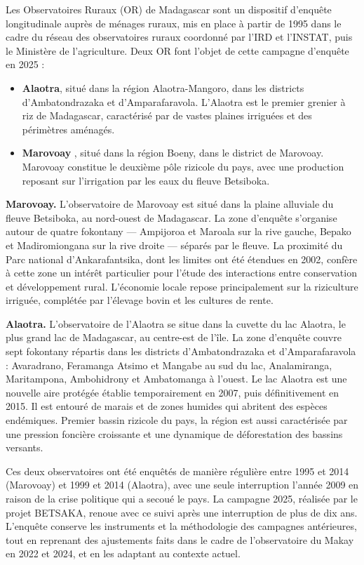 \documentclass[
  french,
  letterpaper,
]{report}
\providecommand{\tightlist}{%
  \setlength{\itemsep}{0pt}\setlength{\parskip}{0pt}}
\begin{document}
Les Observatoires Ruraux (OR) de Madagascar sont un dispositif d'enquête
longitudinale auprès de ménages ruraux, mis en place à partir de 1995
dans le cadre du réseau des observatoires ruraux coordonné par l'IRD et
l'INSTAT, puis le Ministère de l'agriculture. Deux OR font l'objet de
cette campagne d'enquête en 2025 :

\begin{itemize}
\tightlist
\item
  \textbf{Alaotra}, situé dans la région Alaotra-Mangoro, dans les
  districts d'Ambatondrazaka et d'Amparafaravola. L'Alaotra est le
  premier grenier à riz de Madagascar, caractérisé par de vastes plaines
  irriguées et des périmètres aménagés.
\item
  \textbf{Marovoay} , situé dans la région Boeny, dans le district de
  Marovoay. Marovoay constitue le deuxième pôle rizicole du pays, avec
  une production reposant sur l'irrigation par les eaux du fleuve
  Betsiboka.
\end{itemize}

\textbf{Marovoay.} L'observatoire de Marovoay est situé dans la plaine
alluviale du fleuve Betsiboka, au nord-ouest de Madagascar. La zone
d'enquête s'organise autour de quatre fokontany --- Ampijoroa et Maroala
sur la rive gauche, Bepako et Madiromiongana sur la rive droite ---
séparés par le fleuve. La proximité du Parc national d'Ankarafantsika,
dont les limites ont été étendues en 2002, confère à cette zone un
intérêt particulier pour l'étude des interactions entre conservation et
développement rural. L'économie locale repose principalement sur la
riziculture irriguée, complétée par l'élevage bovin et les cultures de
rente.

\textbf{Alaotra.} L'observatoire de l'Alaotra se situe dans la cuvette
du lac Alaotra, le plus grand lac de Madagascar, au centre-est de l'île.
La zone d'enquête couvre sept fokontany répartis dans les districts
d'Ambatondrazaka et d'Amparafaravola : Avaradrano, Feramanga Atsimo et
Mangabe au sud du lac, Analamiranga, Maritampona, Ambohidrony et
Ambatomanga à l'ouest. Le lac Alaotra est une nouvelle aire protégée
établie temporairement en 2007, puis définitivement en 2015. Il est
entouré de marais et de zones humides qui abritent des espèces
endémiques. Premier bassin rizicole du pays, la région est aussi
caractérisée par une pression foncière croissante et une dynamique de
déforestation des bassins versants.

Ces deux observatoires ont été enquêtés de manière régulière entre 1995
et 2014 (Marovoay) et 1999 et 2014 (Alaotra), avec une seule
interruption l'année 2009 en raison de la crise politique qui a secoué
le pays. La campagne 2025, réalisée par le projet BETSAKA, renoue avec
ce suivi après une interruption de plus de dix ans. L'enquête conserve
les instruments et la méthodologie des campagnes antérieures, tout en
reprenant des ajustements faits dans le cadre de l'observatoire du Makay
en 2022 et 2024, et en les adaptant au contexte actuel.
\end{document}
